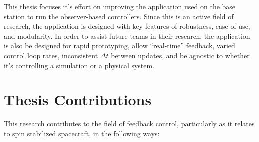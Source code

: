This thesis focuses it's effort on improving the application used on the base station to run the observer-based controllers.  Since this is an active field of research, the application is designed with key features of robustness, ease of use, and modularity.  In order to assist future teams in their research, the application is also be designed for rapid prototyping, allow ``real-time'' feedback, varied control loop rates, inconsistent $\Delta t$ between updates, and be agnostic to whether it's controlling a simulation or a physical system.

\section{Thesis Contributions}
\label{sec:ThesisContributions}

This research contributes to the field of feedback control, particularly as it relates to spin stabilized spacecraft, in the following ways:

